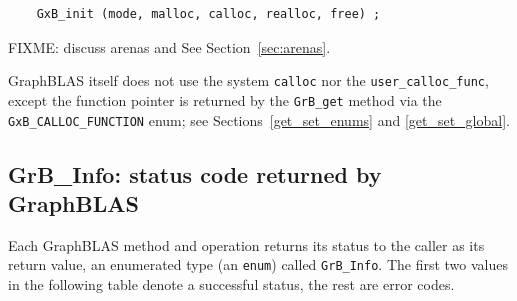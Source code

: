     {\footnotesize
    \begin{verbatim}
    GxB_init (mode, malloc, calloc, realloc, free) ; \end{verbatim}}

FIXME: discuss arenas and See Section~\ref{sec:arenas}.

GraphBLAS itself does not use the system \verb'calloc' nor the
\verb'user_calloc_func', except the function pointer is returned by the
\verb'GrB_get' method via the \verb'GxB_CALLOC_FUNCTION' enum;
see Sections~\ref{get_set_enums} and \ref{get_set_global}.

\subsection{{\sf GrB\_Info:} status code returned by GraphBLAS} %
\label{info}

Each GraphBLAS method and operation returns its status to the caller as its
return value, an enumerated type (an \verb'enum') called \verb'GrB_Info'.  The
first two values in the following table denote a successful status, the rest
are error codes.

